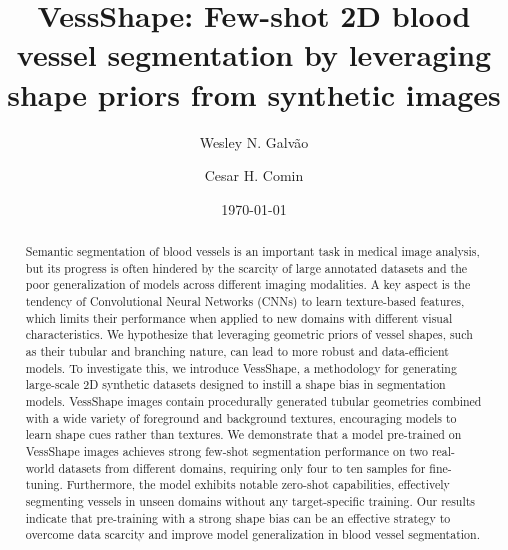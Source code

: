 \documentclass[%
reprint,
nofootinbib,
 amsmath,amssymb,
aps,
superscriptaddress,
showkeys,
longbibliography
]{revtex4-1}
\begin{document}
%

\title{VessShape: Few-shot 2D blood vessel segmentation by leveraging shape priors from synthetic images}

\author{Wesley N. Galvão}

\author{Cesar H. Comin}

\date{\today}%

\begin{abstract}

Semantic segmentation of blood vessels is an important task in medical image analysis, but its progress is often hindered by the scarcity of large annotated datasets and the poor generalization of models across different imaging modalities. A key aspect is the tendency of Convolutional Neural Networks (CNNs) to learn texture-based features, which limits their performance when applied to new domains with different visual characteristics. We hypothesize that leveraging geometric priors of vessel shapes, such as their tubular and branching nature, can lead to more robust and data-efficient models. To investigate this, we introduce VessShape, a methodology for generating large-scale 2D synthetic datasets designed to instill a shape bias in segmentation models. VessShape images contain procedurally generated tubular geometries combined with a wide variety of foreground and background textures, encouraging models to learn shape cues rather than textures. We demonstrate that a model pre-trained on VessShape images achieves strong few-shot segmentation performance on two real-world datasets from different domains, requiring only four to ten samples for fine-tuning. Furthermore, the model exhibits notable zero-shot capabilities, effectively segmenting vessels in unseen domains without any target-specific training. Our results indicate that pre-training with a strong shape bias can be an effective strategy to overcome data scarcity and improve model generalization in blood vessel segmentation.

\end{abstract}
\end{document}
